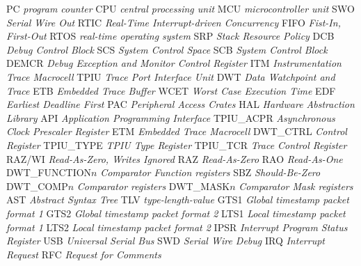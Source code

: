  {PC} {\textit{program counter}}
 {CPU} {\textit{central processing unit}}
 {MCU} {\textit{microcontroller unit}}
 {SWO} {\textit{Serial Wire Out}}
 {RTIC} {\textit{Real-Time Interrupt-driven Concurrency}}
 {FIFO} {\textit{Fist-In, First-Out}}
 {RTOS} {\textit{real-time operating system}}
 {SRP} {\textit{Stack Resource Policy}}
 {DCB} {\textit{Debug Control Block}}
 {SCS} {\textit{System Control Space}}
 {SCB} {\textit{System Control Block}}
 {DEMCR} {\textit{Debug Exception and Monitor Control Register}}
 {ITM} {\textit{Instrumentation Trace Macrocell}}
 {TPIU} {\textit{Trace Port Interface Unit}}
 {DWT} {\textit{Data Watchpoint and Trace}}
 {ETB} {\textit{Embedded Trace Buffer}}
 {WCET} {\textit{Worst Case Execution Time}}
 {EDF} {\textit{Earliest Deadline First}}
 {PAC} {\textit{Peripheral Access Crates}}
 {HAL} {\textit{Hardware Abstraction Library}}
 {API} {\textit{Application Programming Interface}}
 {TPIU\_ACPR} {\textit{Asynchronous Clock Prescaler Register}}
 {ETM} {\textit{Embedded Trace Macrocell}}
 {DWT\_CTRL} {\textit{Control Register}}
 {TPIU\_TYPE} {\textit{TPIU Type Register}}
 {TPIU\_TCR} {\textit{Trace Control Register}}
 {RAZ/WI} {\textit{Read-As-Zero, Writes Ignored}}
 {RAZ} {\textit{Read-As-Zero}}
 {RAO} {\textit{Read-As-One}}
 {DWT\_FUNCTION$n$} {\textit{Comparator Function registers}}
 {SBZ} {\textit{Should-Be-Zero}}
 {DWT\_COMP$n$} {\textit{Comparator registers}}
 {DWT\_MASK$n$} {\textit{Comparator Mask registers}}
 {AST} {\textit{Abstract Syntax Tree}}
 {TLV} {\textit{type-length-value}}
 {GTS1} {\textit{Global timestamp packet format 1}}
 {GTS2} {\textit{Global timestamp packet format 2}}
 {LTS1} {\textit{Local timestamp packet format 1}}
 {LTS2} {\textit{Local timestamp packet format 2}}
 {IPSR} {\textit{Interrupt Program Status Register}}
 {USB} {\textit{Universal Serial Bus}}
 {SWD} {\textit{Serial Wire Debug}}
 {IRQ} {\textit{Interrupt Request}}
 {RFC} {\textit{Request for Comments}}
